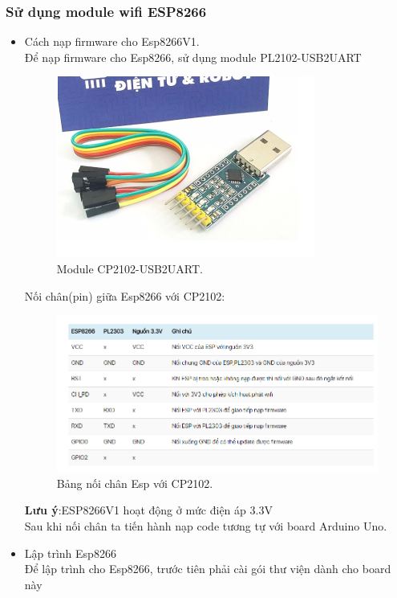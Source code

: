 \documentclass[a4paper,12pt,oneside]{article}
\begin{document}
\subsubsection{Sử dụng module wifi ESP8266}
\begin{itemize}
\item Cách nạp firmware cho Esp8266V1.\\
Để nạp firmware cho Esp8266, sử dụng module PL2102-USB2UART
\begin{figure}[H]
\begin{center}
\includegraphics[scale=0.8]{hinh/cp2102.png}
\end{center}
\caption{Module CP2102-USB2UART.}
\end{figure}
Nối chân(pin) giữa Esp8266 với CP2102:
\begin{figure}[H]
\begin{center}
\includegraphics[scale=0.8]{hinh/noichanesp.png}
\end{center}
\caption{Bảng nối chân Esp với CP2102.}
\end{figure}
\textbf{Lưu ý}:ESP8266V1 hoạt động ở mức điện áp 3.3V\\
Sau khi nối chân ta tiến hành nạp code tương tự với board Arduino Uno.
\item Lập trình Esp8266\\
Để lập trình cho Esp8266, trước tiên phải cài gói thư viện dành cho board này\

\end{itemize}
\end{document}
